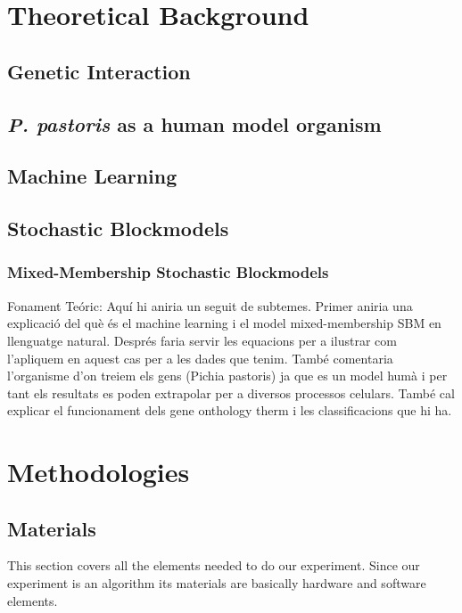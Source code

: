 \documentclass[11pt]{article}
\begin{document}
\section{Theoretical Background}
  \subsection{Genetic Interaction}
  
  \subsection{\textit{P. pastoris} as a human model organism}

  \subsection{Machine Learning}
  
  \subsection{Stochastic Blockmodels}
  
    \subsubsection{Mixed-Membership Stochastic Blockmodels}
    
  
  
  
Fonament Teóric: Aquí hi aniria un seguit de subtemes. Primer aniria una explicació del què és el machine learning i el model mixed-membership SBM en llenguatge natural. Després faria servir les equacions per a ilustrar com l'apliquem en aquest cas per a les dades que tenim.  També comentaria l'organisme d'on treiem els gens (Pichia pastoris) ja que es un model humà i per tant els resultats es poden extrapolar per a diversos processos celulars. També cal explicar el funcionament dels gene onthology therm i les classificacions que hi ha.

\section{Methodologies}

  \subsection{Materials}
  This section covers all the elements needed to do our experiment. Since our experiment is an algorithm its materials are basically hardware and software elements.
\end{document}

